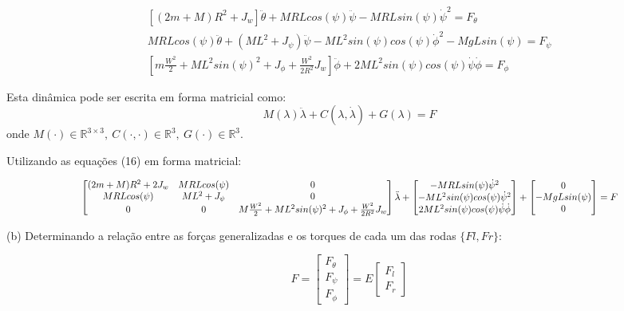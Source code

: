 \documentclass[10pt]{article}
\begin{document}
\begin{equation}
\begin{gathered}
    \left[(2m + M)R^2 + J_w\right] \ddot{\theta} + MRLcos(\psi)\ddot{\psi} - MRLsin(\psi)\dot{\psi}^2 = F_{\theta} \\
    MRLcos(\psi)\ddot{\theta} + (ML^2 + J_\psi)\ddot{\psi} - ML^2sin(\psi)cos(\psi)\dot{\phi}^2 - MgLsin(\psi) = F_{\psi} \\
    \left[m\frac{W^2}{2} + ML^2sin(\psi)^2 + J_{\phi} + \frac{W^2}{2R^2} J_w \right]\ddot{\phi} + 2ML^2sin(\psi)cos(\psi)\dot{\psi}\dot{\phi} = F_{\phi}
\end{gathered}
\end{equation}

\quad Esta dinâmica pode ser escrita em forma matricial como:
\begin{equation}
    M(\lambda) \ddot{\lambda} + C(\lambda, \dot{\lambda}) + G(\lambda) = F
\end{equation}
onde $M(\cdot) \in \mathbb{R}^{3 \times 3}, \ C(\cdot, \cdot) \in \mathbb{R}^3, \ G(\cdot) \in \mathbb{R}^3$.

\quad Utilizando as equações (16) em forma matricial:

\begin{equation}
    \scalebox{0.85}{$
    \begin{bmatrix}
        (2m + M)R^2 + 2J_w & MRLcos(\psi) & 0 \\
        MRLcos(\psi) & ML^2 + J_\psi & 0 \\
        0 & 0 & M\frac{W^2}{2}+ML^2sin(\psi)^2+J_{\phi}+\frac{W^2}{2R^2}J_w
    \end{bmatrix} \ddot{\lambda}+
    \begin{bmatrix}
        - MRLsin(\psi)\dot{\psi}^2 \\
        - ML^2sin(\psi)cos(\psi)\dot{\psi}^2 \\
        2ML^2sin(\psi)cos(\psi)\dot\psi\dot\phi
    \end{bmatrix} +
    \begin{bmatrix}
        0 \\
        - MgLsin(\psi) \\
        0
    \end{bmatrix} = F
    $}
\end{equation}

\quad (b) Determinando a relação entre as forças generalizadas e os torques de
cada um das rodas $\{Fl,Fr\}$:

\begin{equation}
    F =
    \begin{bmatrix}
        F_{\theta} \\
        F_{\psi} \\
        F_{\phi}
    \end{bmatrix} = E
    \begin{bmatrix}
        F_l \\
        F_r
    \end{bmatrix}
\end{equation}
\end{document}
